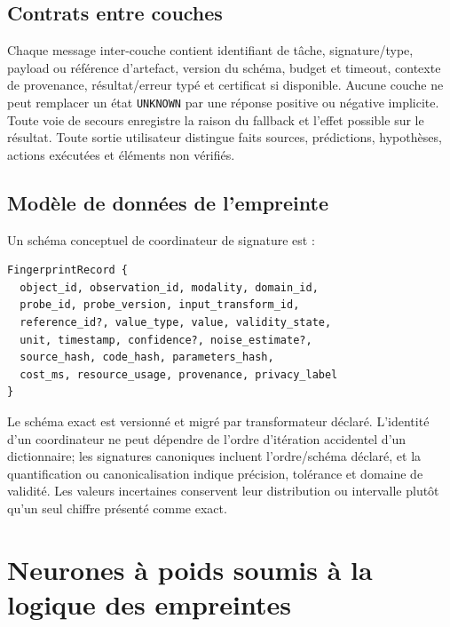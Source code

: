 \documentclass[11pt,a4paper]{report}
\begin{document}
\section{Contrats entre couches}
Chaque message inter-couche contient identifiant de tâche, signature/type, payload ou référence d'artefact, version du schéma, budget et timeout, contexte de provenance, résultat/erreur typé et certificat si disponible. Aucune couche ne peut remplacer un état \texttt{UNKNOWN} par une réponse positive ou négative implicite. Toute voie de secours enregistre la raison du fallback et l'effet possible sur le résultat. Toute sortie utilisateur distingue faits sources, prédictions, hypothèses, actions exécutées et éléments non vérifiés.

\section{Modèle de données de l'empreinte}
Un schéma conceptuel de coordinateur de signature est :
\begin{lstlisting}
FingerprintRecord {
  object_id, observation_id, modality, domain_id,
  probe_id, probe_version, input_transform_id,
  reference_id?, value_type, value, validity_state,
  unit, timestamp, confidence?, noise_estimate?,
  source_hash, code_hash, parameters_hash,
  cost_ms, resource_usage, provenance, privacy_label
}
\end{lstlisting}
Le schéma exact est versionné et migré par transformateur déclaré. L'identité d'un coordinateur ne peut dépendre de l'ordre d'itération accidentel d'un dictionnaire; les signatures canoniques incluent l'ordre/schéma déclaré, et la quantification ou canonicalisation indique précision, tolérance et domaine de validité. Les valeurs incertaines conservent leur distribution ou intervalle plutôt qu'un seul chiffre présenté comme exact.

\chapter{Neurones à poids soumis à la logique des empreintes}
\end{document}
